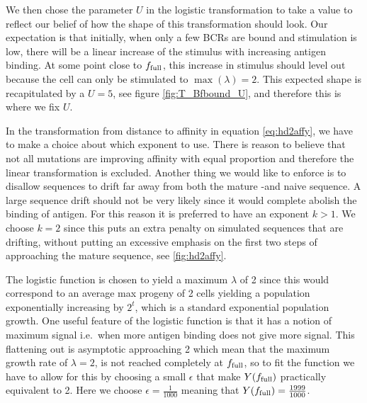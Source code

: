 We then chose the parameter $U$ in the logistic transformation to take a value to reflect our belief of how the shape of this transformation should look.
Our expectation is that initially, when only a few BCRs are bound and stimulation is low, there will be a linear increase of the stimulus with increasing antigen binding.
At some point close to $f_{\text{full}}$, this increase in stimulus should level out because the cell can only be stimulated to $\operatorname{max}(\lambda)=2$.
This expected shape is recapitulated by a $U=5$, see figure \ref{fig:T_Bfbound_U}, and therefore this is where we fix $U$.

In the transformation from distance to affinity in equation \ref{eq:hd2affy}, we have to make a choice about which exponent to use.
There is reason to believe that not all mutations are improving affinity with equal proportion and therefore the linear transformation is excluded.
Another thing we would like to enforce is to disallow sequences to drift far away from both the mature -and naive sequence.
A large sequence drift should not be very likely since it would complete abolish the binding of antigen.
For this reason it is preferred to have an exponent $k>1$.
We choose $k=2$ since this puts an extra penalty on simulated sequences that are drifting, without putting an excessive emphasis on the first two steps of approaching the mature sequence, see \ref{fig:hd2affy}.

The logistic function is chosen to yield a maximum $\lambda$ of 2 since this would correspond to an average max progeny of 2 cells yielding a population exponentially increasing by $2^t$, which is a standard exponential population growth.
One useful feature of the logistic function is that it has a notion of maximum signal i.e.\ when more antigen binding does not give more signal.
This flattening out is asymptotic approaching 2 which mean that the maximum growth rate of $\lambda=2$, is not reached completely at $f_{\text{full}}$, so to fit the function we have to allow for this by choosing a small $\epsilon$ that make $Y(f_{\text{full}})$ practically equivalent to 2.
Here we choose $\epsilon=\frac{1}{1000}$ meaning that $Y(f_{\text{full}}) = \frac{1999}{1000}$.

